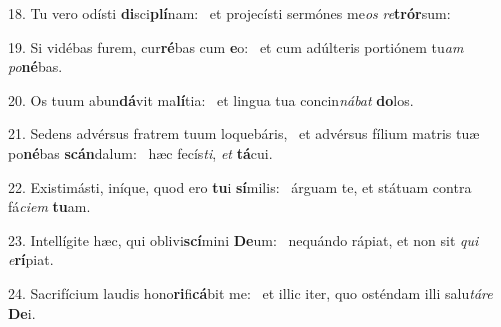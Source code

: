 18. Tu vero odísti \textbf{di}sci\textbf{plí}nam: \ast\  et projecísti sermónes me\textit{os} \textit{re}\textbf{trór}sum:\

19. Si vidébas furem, cur\textbf{ré}bas cum \textbf{e}o: \ast\  et cum adúlteris portiónem tu\textit{am} \textit{po}\textbf{né}bas.\

20. Os tuum abun\textbf{dá}vit ma\textbf{lí}tia: \ast\  et lingua tua concin\textit{ná}\textit{bat} \textbf{do}los.\

21. Sedens advérsus fratrem tuum loquebáris, \dag\  et advérsus fílium matris tuæ po\textbf{né}bas \textbf{scán}dalum: \ast\  hæc fecís\textit{ti}, \textit{et} \textbf{tá}cui.\

22. Existimásti, iníque, quod ero \textbf{tu}i \textbf{sí}milis: \ast\  árguam te, et státuam contra fá\textit{ci}\textit{em} \textbf{tu}am.\

23. Intellígite hæc, qui oblivi\textbf{scí}mini \textbf{De}um: \ast\  nequándo rápiat, et non sit \textit{qui} \textit{e}\textbf{rí}piat.\

24. Sacrifícium laudis hono\textbf{ri}fi\textbf{cá}bit me: \ast\  et illic iter, quo osténdam illi salu\textit{tá}\textit{re} \textbf{De}i.\

